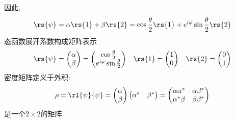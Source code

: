 \begin{frame} 
    \frametitle{}
    因此, 
    \[\rs{\psi} =\alpha\rs{1}+\beta\rs{2} = \cos\frac{\theta}{2}\rs{1}+e^{i\varphi} \sin\frac{\theta}{2}\rs{2}\] 
    态函数展开系数构成矩阵表示\\
   \[
    \begin{matrix} 
    \rs{\psi} =\begin{pmatrix}
            \alpha\\
            \beta
    \end{pmatrix} =\begin{pmatrix}
        \cos\frac{\theta}{2}\\
        e^{i\varphi} \sin\frac{\theta}{2}
    \end{pmatrix}
    &    
    \rs{1} 
    =\begin{pmatrix}
        1\\
        0
    \end{pmatrix}
    &
    \rs{2} 
    =\begin{pmatrix}
        0\\
        1
    \end{pmatrix}
    \end{matrix}    
    \]
密度矩阵定义于外积:
 \[ \rho =\rl{\psi}{\psi} = \begin{pmatrix}
    \alpha\\
    \beta
\end{pmatrix} \begin{pmatrix}
    \alpha^* & \beta^*
\end{pmatrix}  = \begin{pmatrix}
    \alpha \alpha^*   &  \alpha \beta^* \\
    \alpha^* \beta   & \beta \beta^* 
\end{pmatrix} \]
 是一个$2\times 2$的矩阵
\end{frame}

